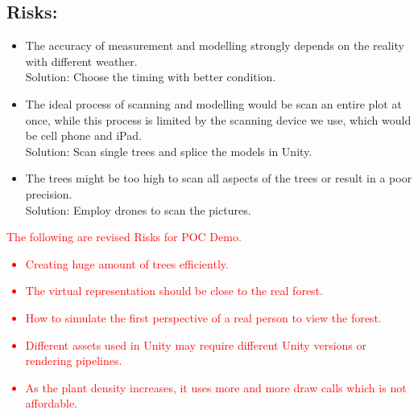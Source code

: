 \documentclass{article}
\begin{document}
\subsection{Risks:}
\begin{itemize}
    \item The accuracy of measurement and modelling strongly depends on the reality with different
    weather.\\Solution: Choose the timing with better condition.
        
    \item The ideal process of scanning and modelling would be scan an entire plot at once, while this
    process is limited by the scanning device we use, which would be cell phone and iPad.\\Solution:
    Scan single trees and splice the models in Unity.
    
    \item The trees might be too high to scan all aspects of the trees or result in a poor
    precision.\\Solution: Employ drones to scan the pictures.
\end{itemize}

\textcolor{red}{The following are revised Risks for POC Demo.}
\textcolor{red}{
\begin{itemize}
\item Creating huge amount of trees efficiently.
\item The virtual representation should be close to the real forest.
\item How to simulate the first perspective of a real person to view the forest.
\item Different assets used in Unity may require different Unity versions or rendering pipelines.
\item As the plant density increases, it uses more and more draw calls which is not affordable.
\end{itemize}
}    
\end{document}
